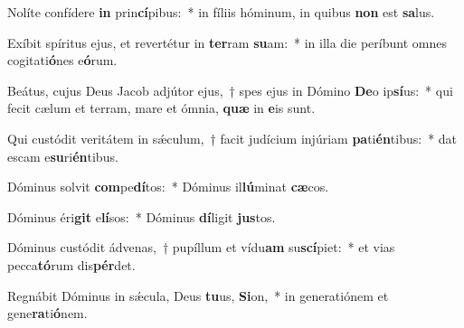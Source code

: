 \item Nolíte confídere \textbf{in} prin\textbf{cí}pibus:~* in fíliis hóminum, in quibus \textbf{non} est \textbf{sa}lus.
\item Exíbit spíritus ejus, et revertétur in \textbf{ter}ram \textbf{su}am:~* in illa die períbunt omnes cogitati\textbf{ó}nes e\textbf{ó}rum.
\item Beátus, cujus Deus Jacob adjútor ejus,~† spes ejus in Dómino \textbf{De}o ip\textbf{sí}us:~* qui fecit cælum et terram, mare et ómnia, \textbf{quæ} in \textbf{e}is sunt.
\item Qui custódit veritátem in sǽculum,~† facit judícium injúriam \textbf{pa}ti\textbf{én}tibus:~* dat escam e\textbf{su}ri\textbf{én}tibus.
\item Dóminus solvit \textbf{com}pe\textbf{dí}tos:~* Dóminus il\textbf{lú}minat \textbf{cæ}cos.
\item Dóminus éri\textbf{git} e\textbf{lí}sos:~* Dóminus \textbf{dí}ligit \textbf{jus}tos.
\item Dóminus custódit ádvenas,~† pupíllum et vídu\textbf{am} su\textbf{scí}piet:~* et vias pecca\textbf{tó}rum dis\textbf{pér}det.
\item Regnábit Dóminus in sǽcula, Deus \textbf{tu}us, \textbf{Si}on,~* in generatiónem et gene\textbf{ra}ti\textbf{ó}nem.
